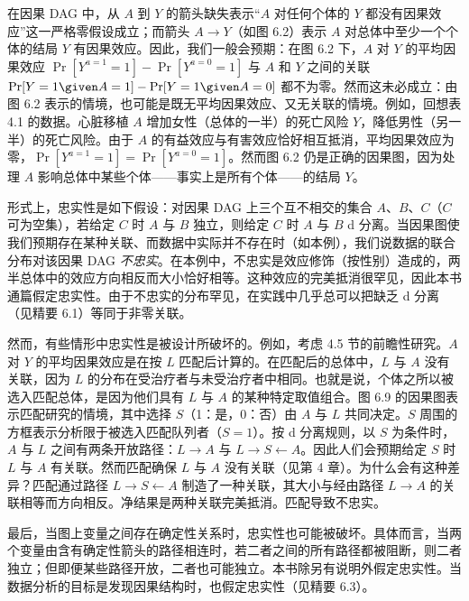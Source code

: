 \begin{finepoint}[忠实性]
在因果 DAG 中，从 $A$ 到 $Y$ 的箭头缺失表示“$A$ 对任何个体的 $Y$ 都没有因果效应”这一严格零假设成立；而箭头 $A\to Y$（如图 6.2）表示 $A$ 对总体中至少一个个体的结局 $Y$ 有因果效应。因此，我们一般会预期：在图 6.2 下，$A$ 对 $Y$ 的平均因果效应 $\Pr[Y^{a=1}=1]-\Pr[Y^{a=0}=1]$ 与 $A$ 和 $Y$ 之间的关联 $\Pr[Y=1\given A=1]-\Pr[Y=1\given A=0]$ 都不为零。然而这未必成立：由图 6.2 表示的情境，也可能是既无平均因果效应、又无关联的情境。例如，回想表 4.1 的数据。心脏移植 $A$ 增加女性（总体的一半）的死亡风险 $Y$，降低男性（另一半）的死亡风险。由于 $A$ 的有益效应与有害效应恰好相互抵消，平均因果效应为零，$\Pr[Y^{a=1}=1]=\Pr[Y^{a=0}=1]$。然而图 6.2 仍是正确的因果图，因为处理 $A$ 影响总体中某些个体——事实上是所有个体——的结局 $Y$。

形式上，忠实性是如下假设：对因果 DAG 上三个互不相交的集合 $A$、$B$、$C$（$C$ 可为空集），若给定 $C$ 时 $A$ 与 $B$ 独立，则给定 $C$ 时 $A$ 与 $B$ d 分离。当因果图使我们预期存在某种关联、而数据中实际并不存在时（如本例），我们说数据的联合分布对该因果 DAG \emph{不忠实}。在本例中，不忠实是效应修饰（按性别）造成的，两半总体中的效应方向相反而大小恰好相等。这种效应的完美抵消很罕见，因此本书通篇假定忠实性。由于不忠实的分布罕见，在实践中几乎总可以把缺乏 d 分离（见精要 6.1）等同于非零关联。

然而，有些情形中忠实性是被设计所破坏的。例如，考虑 4.5 节的前瞻性研究。$A$ 对 $Y$ 的平均因果效应是在按 $L$ 匹配后计算的。在匹配后的总体中，$L$ 与 $A$ 没有关联，因为 $L$ 的分布在受治疗者与未受治疗者中相同。也就是说，个体之所以被选入匹配总体，是因为他们具有 $L$ 与 $A$ 的某种特定取值组合。图 6.9 的因果图表示匹配研究的情境，其中选择 $S$（1：是，0：否）由 $A$ 与 $L$ 共同决定。$S$ 周围的方框表示分析限于被选入匹配队列者（$S=1$）。按 d 分离规则，以 $S$ 为条件时，$A$ 与 $L$ 之间有两条开放路径：$L\to A$ 与 $L\to S\leftarrow A$。因此人们会预期给定 $S$ 时 $L$ 与 $A$ 有关联。然而匹配确保 $L$ 与 $A$ 没有关联（见第 4 章）。为什么会有这种差异？匹配通过路径 $L\to S\leftarrow A$ 制造了一种关联，其大小与经由路径 $L\to A$ 的关联相等而方向相反。净结果是两种关联完美抵消。匹配导致不忠实。

\begin{center}
\label{fig:6.9}
\end{center}

最后，当图上变量之间存在确定性关系时，忠实性也可能被破坏。具体而言，当两个变量由含有确定性箭头的路径相连时，若二者之间的所有路径都被阻断，则二者独立；但即便某些路径开放，二者也可能独立。本书除另有说明外假定忠实性。当数据分析的目标是发现因果结构时，也假定忠实性（见精要 6.3）。
\end{finepoint}

